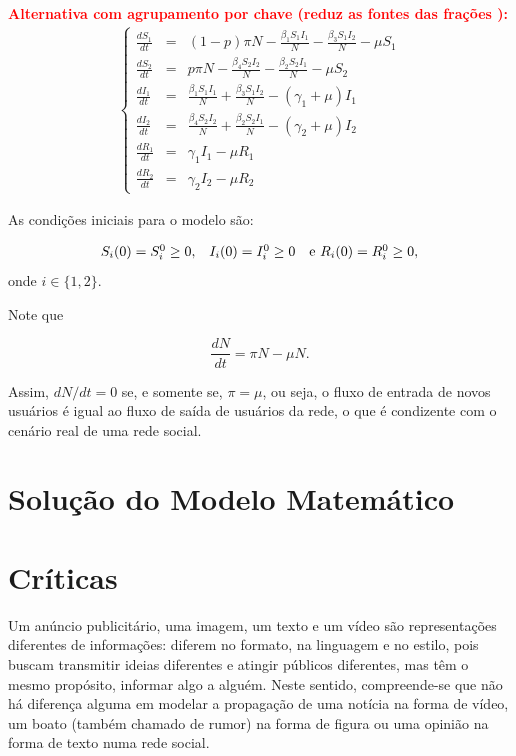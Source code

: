 \documentclass[
	12pt,				%
	openright,			%
	oneside,			%
	a4paper,			%
	english,			%
	french,				%
	spanish,			%
	brazil				%
	]{abntex2}
\newcommand{\grifar}[1]{\textcolor{Red}{\textbf{#1}}}
\begin{document}
\grifar{Alternativa com agrupamento por chave (reduz as fontes das frações ):}
\begin{align}
  \left\{
  \begin{array}{lll}
  \frac{dS_1}{dt} & = & (1-p)\pi N - \frac{\beta_1 S_1 I_1}{N} - \frac{\beta_3 S_1 I_2}{N} - \mu S_1 \\
  \frac{dS_2}{dt} & = & p\pi N - \frac{\beta_4 S_2 I_2}{N} - \frac{\beta_2 S_2 I_1}{N} - \mu S_2 \\
  \frac{dI_1}{dt} & = & \frac{\beta_1 S_1 I_1}{N} + \frac{\beta_3 S_1 I_2}{N} - (\gamma_1 + \mu)I_1 \\
  \frac{dI_2}{dt} & = & \frac{\beta_4 S_2 I_2}{N} + \frac{\beta_2 S_2 I_1}{N} - (\gamma_2 + \mu)I_2 \\
  \frac{dR_1}{dt} & = & \gamma_1 I_1 - \mu R_1 \\
  \frac{dR_2}{dt} & = & \gamma_2 I_2 - \mu R_2
  \end{array} \nonumber
  \right.
\end{align}

As condições iniciais para o modelo são:

\begin{equation}
  \begin{array}{ccc}
    S_i(0) = S_i^0 \geq 0, & I_i(0) = I_i^0 \geq 0 & $e$\ R_i(0) = R_i^0 \geq 0,
  \end{array} \nonumber
\end{equation}
\noindent onde $i \in \{1, 2\}$.

Note que

\begin{equation}
  \frac{dN}{dt} = \pi N - \mu N. \nonumber
\end{equation}

Assim, $dN/dt = 0$ se, e somente se, $\pi = \mu$, ou seja, o fluxo de
entrada de novos usuários é igual ao fluxo de saída de usuários da
rede, o que é condizente com o cenário real de uma rede social.


\chapter{Solução do Modelo Matemático}


\chapter{Críticas}
Um anúncio publicitário, uma imagem, um texto e um vídeo são
representações diferentes de informações: diferem no formato, na
linguagem e no estilo, pois buscam transmitir ideias diferentes e
atingir públicos diferentes, mas têm o mesmo propósito, informar algo
a alguém. Neste sentido, compreende-se que não há diferença alguma em
modelar a propagação de uma notícia na forma de vídeo, um boato
(também chamado de rumor) na forma de figura ou uma opinião na forma
de texto numa rede social.
\end{document}
